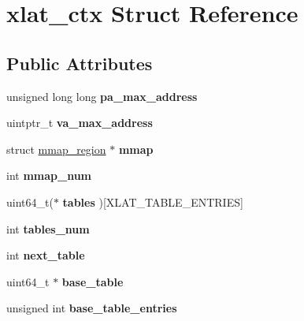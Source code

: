 \hypertarget{structxlat__ctx}{}\section{xlat\+\_\+ctx Struct Reference}
\label{structxlat__ctx}
\subsection*{Public Attributes}
\begin{DoxyCompactItemize}
\item 
\mbox{\label{structxlat__ctx_a2b11408026d239d9e0779ca95c815779}} 
unsigned long long {\bfseries pa\+\_\+max\+\_\+address}
\item 
\mbox{\label{structxlat__ctx_a2512b62f64e6718a06bb34cfd4bd204b}} 
uintptr\+\_\+t {\bfseries va\+\_\+max\+\_\+address}
\item 
\mbox{\label{structxlat__ctx_aad30a51b18ca6b2162d64796d6270145}} 
struct \hyperlink{structmmap__region}{mmap\+\_\+region} $\ast$ {\bfseries mmap}
\item 
\mbox{\label{structxlat__ctx_ad64b521b3a033eaea269bc895773b80c}} 
int {\bfseries mmap\+\_\+num}
\item 
\mbox{\label{structxlat__ctx_ac763338d8076a2fa1fdb3b0d17c5054e}} 
uint64\+\_\+t($\ast$ {\bfseries tables} )\mbox{[}X\+L\+A\+T\+\_\+\+T\+A\+B\+L\+E\+\_\+\+E\+N\+T\+R\+I\+ES\mbox{]}
\item 
\mbox{\label{structxlat__ctx_a2e77c3cabc8d4c0e6d0450fe1fc8f833}} 
int {\bfseries tables\+\_\+num}
\item 
\mbox{\label{structxlat__ctx_afbfbb1f0732cf0e98af0a1fb653f1976}} 
int {\bfseries next\+\_\+table}
\item 
\mbox{\label{structxlat__ctx_ab279d73067deb5eb16e28bedeff74c3b}} 
uint64\+\_\+t $\ast$ {\bfseries base\+\_\+table}
\item 
\mbox{\label{structxlat__ctx_ad6cf4c10f7b7d78495a803293825d10f}} 
unsigned int {\bfseries base\+\_\+table\+\_\+entries}

\end{DoxyCompactItemize}
